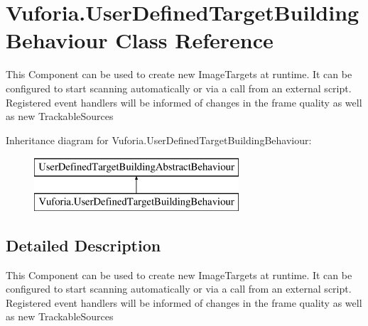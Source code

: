 \hypertarget{class_vuforia_1_1_user_defined_target_building_behaviour}{}\section{Vuforia.\+User\+Defined\+Target\+Building\+Behaviour Class Reference}
\label{class_vuforia_1_1_user_defined_target_building_behaviour}


This Component can be used to create new Image\+Targets at runtime. It can be configured to start scanning automatically or via a call from an external script. Registered event handlers will be informed of changes in the frame quality as well as new Trackable\+Sources  


Inheritance diagram for Vuforia.\+User\+Defined\+Target\+Building\+Behaviour\+:\begin{figure}[H]
\begin{center}
\leavevmode
\includegraphics[height=2.000000cm]{class_vuforia_1_1_user_defined_target_building_behaviour}
\end{center}
\end{figure}


\subsection{Detailed Description}
This Component can be used to create new Image\+Targets at runtime. It can be configured to start scanning automatically or via a call from an external script. Registered event handlers will be informed of changes in the frame quality as well as new Trackable\+Sources 

